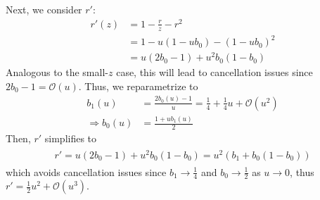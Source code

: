 \documentclass{article}
\begin{document}
Next, we consider $r'$:
%
\begin{align}
  r'(z) & = 1 - \frac{r}{z} - r^2                                                     \\
        & = 1 - u(1 - u b_0) - (1 - u b_0)^2                                          \\
        & = u (2 b_0 - 1) + u^2 b_0 (1 - b_0) \label{eq:r-prime-large-reparametrized}
\end{align}
%
Analogous to the small-$z$ case, this will lead to cancellation issues since $2 b_0 - 1 = \mathcal{O}(u)$.
Thus, we reparametrize to
%
\begin{align}
  b_1(u)             & = \frac{2 b_0(u)-1}{u} = \frac{1}{4} + \frac{1}{4} u + \mathcal{O}(u^2) \\
  \Rightarrow b_0(u) & = \frac{1 + u b_1(u)}{2}
\end{align}
%
Then, $r'$ simplifies to
%
\begin{align}
  \boxed{
    \begin{aligned}
      r' = u(2 b_0-1) + u^2 b_0(1-b_0) = u^2 (b_1 + b_0(1-b_0)) \label{eq:r-prime-large-reparametrized-simplified}
    \end{aligned}
  }
\end{align}
%
which avoids cancellation issues since $b_1 \to \frac{1}{4}$ and $b_0 \to \frac{1}{2}$ as $u \to 0$, thus $r' = \frac{1}{2} u^2 + \mathcal{O}(u^3)$.
\end{document}
